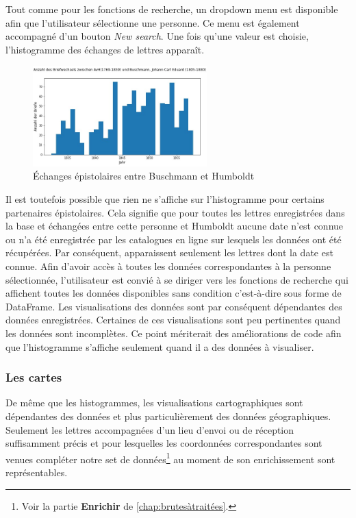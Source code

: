 \documentclass[a4paper, 12pt, twoside]{book}
\begin{document}
Tout comme pour les fonctions de recherche, un dropdown menu est disponible afin que l'utilisateur sélectionne une personne. Ce menu est également accompagné d'un bouton \textit{New search}. Une fois qu'une valeur est choisie, l'histogramme des échanges de lettres apparaît.

\begin{figure}
\vspace{-30pt}
\includegraphics[width=0.6\textwidth]{img/birefwechselmitBuschmann.jpg}
\caption{Échanges épistolaires entre Buschmann et Humboldt}
\label{fig:histogrammeBuschmann}
\vspace{-47pt}
\end{figure}
Il est toutefois possible que rien ne s'affiche sur l'histogramme pour certains partenaires épistolaires. Cela signifie que pour toutes les lettres enregistrées dans la base et échangées entre cette personne et Humboldt aucune date n'est connue ou n'a été enregistrée par les catalogues en ligne sur lesquels les données ont été récupérées. Par conséquent, apparaissent seulement les lettres dont la date est connue. Afin d'avoir accès à toutes les données correspondantes à la personne sélectionnée, l'utilisateur est convié à se diriger vers les fonctions de recherche qui affichent toutes les données disponibles sans condition c'est-à-dire sous forme de DataFrame. Les visualisations des données sont par conséquent dépendantes des données enregistrées. Certaines de ces visualisations sont peu pertinentes quand les données sont incomplètes. Ce point mériterait des améliorations de code afin que l'histogramme s'affiche seulement quand il a des données à visualiser. 

\subsubsection{Les cartes}
De même que les histogrammes, les visualisations cartographiques sont dépendantes des données et plus particulièrement des données géographiques. Seulement les lettres accompagnées d'un lieu d'envoi ou de réception suffisamment précis et pour lesquelles les coordonnées correspondantes sont venues compléter notre set de données\footnote{Voir la partie \textbf{Enrichir} de \autoref{chap:brutesàtraitées}.} au moment de son enrichissement sont représentables. 
\end{document}
